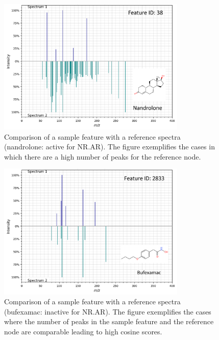 \begin{figure}[h]
  \centering
  \includegraphics[width=0.8\textwidth]{include/img/appendix/sample/spectra_sample.png}
  \caption{Comparison of a sample feature with a reference spectra (nandrolone: active for NR.AR). The figure exemplifies the cases in which there are a high number of peaks for the reference node.}
  \label{fig:sample_spectra}
\end{figure}


\begin{figure}[h]
  \centering
  \includegraphics[width=0.8\textwidth]{include/img/appendix/sample/spectra_sample_bufexamac.png}
  \caption{Comparison of a sample feature with a reference spectra (bufexamac: inactive for NR.AR). The figure exemplifies the cases where the number of peaks in the sample feature and the reference node are comparable leading to high cosine scores.}
  \label{fig:sample_spectra_bufexamac}
\end{figure}


